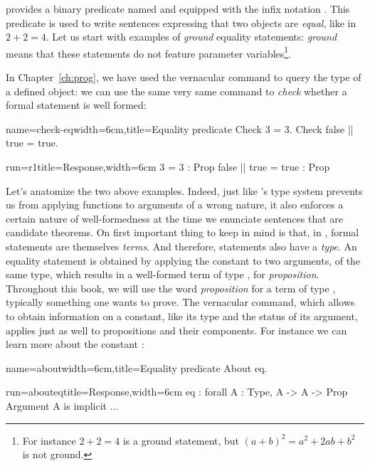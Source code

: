 \Coq{} provides a binary predicate named  and equipped with the
infix notation \C{=}. This predicate is used to write sentences
expressing that two objects are \emph{equal}, like in $2 + 2 = 4$.
Let us start with examples of \Coq{} \emph{ground} equality
statements: \emph{ground} means that these statements do not feature
parameter variables\footnote{For instance $2 + 2 = 4$ is a ground
  statement, but $(a + b)^2 = a^2 + 2ab + b^2$ is not ground.}.

In Chapter~\ref{ch:prog}, we have used the 
vernacular command to query the type of a defined object: we can use
the same very same command to \emph{check} whether a formal statement
is well formed:

\begin{coq}{name=check-eq}{width=6cm,title=Equality predicate}
Check 3 = 3.
Check false || true = true.
\end{coq}
\begin{coqout}{run=r1}{title=Response,width=6cm}
3 = 3 : Prop
false || true = true : Prop
\end{coqout}

Let's anatomize the two above examples. Indeed, just like \Coq{}'s
type system prevents us from applying functions to
arguments of a wrong nature, it also enforces a certain nature of
well-formedness at the time we enunciate sentences that are candidate
theorems. On first important thing to
keep in mind is that, in \Coq{}, formal statements are themselves
\emph{terms}. And therefore, statements also have a \emph{type}. An
equality statement is obtained by applying the constant  to two
arguments, of the same type, which results in a well-formed term of
type , for \emph{proposition}. Throughout this book, we will
use the word \emph{proposition} for a term of type , typically
something one wants to prove. The  vernacular
command, which allows to obtain information on a constant, like its
type and the status of its argument, applies just as well to
propositions and their components. For instance we can learn more
about the constant :

\begin{coq}{name=about}{width=6cm,title=Equality predicate}
About eq.
\end{coq}
\begin{coqout}{run=abouteq}{title=Response,width=6cm}
eq : forall A : Type, A -> A -> Prop
Argument A is implicit ...
\end{coqout}

